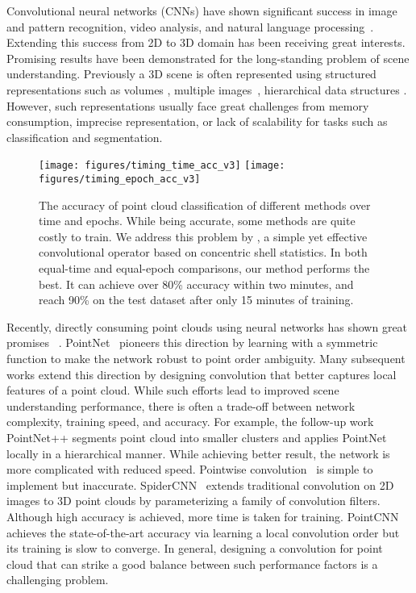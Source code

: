 \documentclass[10pt,twocolumn,letterpaper]{article}
\begin{document}
Convolutional neural networks (CNNs) have shown significant success in image and pattern recognition, video analysis, and natural language processing~\cite{lecun2015deep}. Extending this success from 2D to 3D domain has been receiving great interests. Promising results have been demonstrated for the long-standing problem of scene understanding. Previously a 3D scene is often represented using structured representations such as volumes \cite{qi2016volumetric,li2016fpnn}, multiple images~\cite{su2015multi,qi2016volumetric}, hierarchical data structures \cite{riegler2017octnet,klokov2017escape,wang2017cnn}. However, such representations usually face great challenges from memory consumption, imprecise representation, or lack of scalability for tasks such as classification and segmentation.  

\begin{figure}[t]
	\centering
	\texttt{[image: figures/timing\_time\_acc\_v3]}
	\texttt{[image: figures/timing\_epoch\_acc\_v3]}
	\label{fig:time}
	\caption{The accuracy of point cloud classification of different methods over time and epochs. While being accurate, some methods are quite costly to train. We address this problem by \ourconv, a simple yet effective convolutional operator based on concentric shell statistics. In both equal-time and equal-epoch comparisons, our method performs the best. It can achieve over 80\% accuracy within two minutes, and reach 90\% on the test dataset after only 15 minutes of training.} 
\end{figure}

Recently, directly consuming point clouds using neural networks has shown great promises ~\cite{qi2017pointnet,qi2017pointnet++,xu2018spidercnn,li2018pointcnn}. PointNet~\cite{qi2017pointnet} pioneers this direction by learning with a symmetric function to make the network robust to point order ambiguity. Many subsequent works extend this direction by designing convolution that better captures local features of a point cloud. While such efforts lead to improved scene understanding performance, there is often a trade-off between network complexity, training speed, and accuracy. For example, the follow-up work PointNet++ \cite{qi2017pointnet++} segments point cloud into smaller clusters and applies PointNet locally in a hierarchical manner. While achieving better result, the network is more complicated with reduced speed. Pointwise convolution~\cite{hua2017point} is simple to implement but inaccurate. SpiderCNN~\cite{xu2018spidercnn} extends traditional convolution on 2D images to 3D point clouds by parameterizing a family of convolution filters. Although high accuracy is achieved, more time is taken for training. PointCNN~\cite{li2018pointcnn} achieves the state-of-the-art accuracy via learning a local convolution order but its training is slow to converge. In general, designing a convolution for point cloud that can strike a good balance between such performance factors is a challenging problem.
\end{document}
